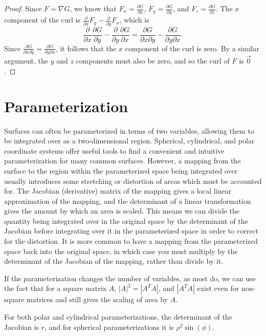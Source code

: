 \begin{proof}
    Since $F = \nabla G$, we know that $F_x = \frac{\partial{G}}{\partial{x}}$, $F_y = \frac{\partial{G}}{\partial{y}}$, and $F_z = \frac{\partial{G}}{\partial{z}}$. The $x$ component of the curl is $\frac{\partial}{\partial{x}}F_y - \frac{\partial}{\partial{y}}F_x$, which is \[\frac{\partial}{\partial{x}}\frac{\partial{G}}{\partial{y}} - \frac{\partial}{\partial{y}}\frac{\partial{G}}{\partial{x}} = \frac{\partial{G}}{\partial{x}\partial{y}} - \frac{\partial{G}}{\partial{y}\partial{x}}.\] Since $\frac{\partial{G}}{\partial{x}\partial{y}} = \frac{\partial{G}}{\partial{y}\partial{x}}$, it follows that the $x$ component of the curl is zero. By a similar argument, the $y$ and $z$ components must also be zero, and so the curl of $F$ is $\vec{0}$.
\end{proof}

\section{Parameterization}

Surfaces can often be parameterized in terms of two variables, allowing them to be integrated over as a two-dimensional region. Spherical, cylindrical, and polar coordinate systems offer useful tools to find a convenient and intuitive parameterization for many common surfaces. However, a mapping from the surface to the region within the parameterized space being integrated over usually introduces some stretching or distortion of areas which must be accounted for. The Jacobian (derivative) matrix of the mapping gives a local linear approximation of the mapping, and the determinant of a linear transformation gives the amount by which an area is scaled. This means we can divide the quantity being integrated over in the original space by the determinant of the Jacobian before integrating over it in the parameterized space in order to correct for the distortion. It is more common to have a mapping from the parameterized space back into the original space, in which case you must multiply by the determinant of the Jacobian of the mapping, rather than divide by it.

If the parameterization changes the number of variables, as most do, we can use the fact that for a square matrix $A$, $|A|^2 = |A^TA|$, and $|A^TA|$ exist even for non-square matrices and still gives the scaling of area by $A$.

For both polar and cylindrical parameterizations, the determinant of the Jacobian is $r$, and for spherical parameterizations it is $\rho^2\sin(\phi)$.
